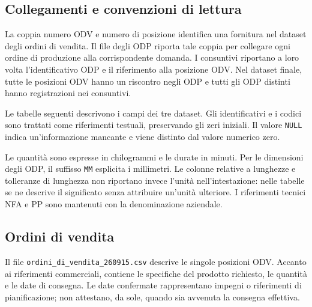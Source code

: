 \subsection{Collegamenti e convenzioni di lettura}
\label{sec:dataset-links}

La coppia numero ODV e numero di posizione identifica una fornitura nel dataset degli ordini di vendita. Il file degli ODP riporta tale coppia per collegare ogni ordine di produzione alla corrispondente domanda. I consuntivi riportano a loro volta l'identificativo ODP e il riferimento alla posizione ODV. Nel dataset finale, tutte le posizioni ODV hanno un riscontro negli ODP e tutti gli ODP distinti hanno registrazioni nei consuntivi.

Le tabelle seguenti descrivono i campi dei tre dataset. Gli identificativi e i codici sono trattati come riferimenti testuali, preservando gli zeri iniziali. Il valore \texttt{NULL} indica un'informazione mancante e viene distinto dal valore numerico zero.

Le quantità sono espresse in chilogrammi e le durate in minuti. Per le dimensioni degli ODP, il suffisso \texttt{MM} esplicita i millimetri. Le colonne relative a lunghezze e tolleranze di lunghezza non riportano invece l'unità nell'intestazione: nelle tabelle se ne descrive il significato senza attribuire un'unità ulteriore. I riferimenti tecnici NFA e PP sono mantenuti con la denominazione aziendale.

\subsection{Ordini di vendita}
\label{sec:sales-order-data}

Il file \nolinkurl{ordini_di_vendita_260915.csv} descrive le singole posizioni ODV. Accanto ai riferimenti commerciali, contiene le specifiche del prodotto richiesto, le quantità e le date di consegna. Le date confermate rappresentano impegni o riferimenti di pianificazione; non attestano, da sole, quando sia avvenuta la consegna effettiva.

